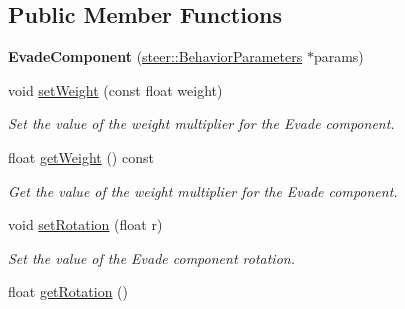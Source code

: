 \subsection*{Public Member Functions}
\begin{DoxyCompactItemize}
\item 
\hypertarget{classsteer_1_1_evade_component_a56c6cc0f6e8e819ab3aba63b461a897b}{{\bfseries Evade\-Component} (\hyperlink{structsteer_1_1_behavior_parameters}{steer\-::\-Behavior\-Parameters} $\ast$params)}\label{classsteer_1_1_evade_component_a56c6cc0f6e8e819ab3aba63b461a897b}

\item 
void \hyperlink{classsteer_1_1_evade_component_aa4508855f3d115907b2706d9a2349755}{set\-Weight} (const float weight)
\begin{DoxyCompactList}\small\item\em Set the value of the weight multiplier for the Evade component. \end{DoxyCompactList}\item 
\hypertarget{classsteer_1_1_evade_component_af8e0bea9a0297bb66e73a04e7aaa4a3d}{float \hyperlink{classsteer_1_1_evade_component_af8e0bea9a0297bb66e73a04e7aaa4a3d}{get\-Weight} () const }\label{classsteer_1_1_evade_component_af8e0bea9a0297bb66e73a04e7aaa4a3d}

\begin{DoxyCompactList}\small\item\em Get the value of the weight multiplier for the Evade component. \end{DoxyCompactList}\item 
\hypertarget{classsteer_1_1_evade_component_a525a0526444c1ae02938f69ced7cf1c2}{void \hyperlink{classsteer_1_1_evade_component_a525a0526444c1ae02938f69ced7cf1c2}{set\-Rotation} (float r)}\label{classsteer_1_1_evade_component_a525a0526444c1ae02938f69ced7cf1c2}

\begin{DoxyCompactList}\small\item\em Set the value of the Evade component rotation. \end{DoxyCompactList}\item 
\hypertarget{classsteer_1_1_evade_component_a7567625165b0e98b95b5a6080f134e89}{float \hyperlink{classsteer_1_1_evade_component_a7567625165b0e98b95b5a6080f134e89}{get\-Rotation} ()}\label{classsteer_1_1_evade_component_a7567625165b0e98b95b5a6080f134e89}


\end{DoxyCompactItemize}

